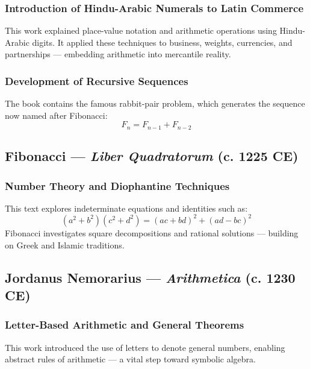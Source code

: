 \documentclass[9pt]{article}
\begin{document}
\subsubsection*{Introduction of Hindu-Arabic Numerals to Latin Commerce}

This work explained place-value notation and arithmetic operations using Hindu-Arabic digits.  
It applied these techniques to business, weights, currencies, and partnerships — embedding arithmetic into mercantile reality.

\subsubsection*{Development of Recursive Sequences}

The book contains the famous rabbit-pair problem, which generates the sequence now named after Fibonacci:  
\[
F_n = F_{n-1} + F_{n-2}
\]

\vspace{0.5em}

\subsection*{Fibonacci — \textit{Liber Quadratorum} (c. 1225 CE)}

\subsubsection*{Number Theory and Diophantine Techniques}

This text explores indeterminate equations and identities such as:
\[
(a^2 + b^2)(c^2 + d^2) = (ac + bd)^2 + (ad - bc)^2
\]
Fibonacci investigates square decompositions and rational solutions — building on Greek and Islamic traditions.

\vspace{0.5em}

\subsection*{Jordanus Nemorarius — \textit{Arithmetica} (c. 1230 CE)}

\subsubsection*{Letter-Based Arithmetic and General Theorems}

This work introduced the use of letters to denote general numbers, enabling abstract rules of arithmetic — a vital step toward symbolic algebra.
\end{document}
